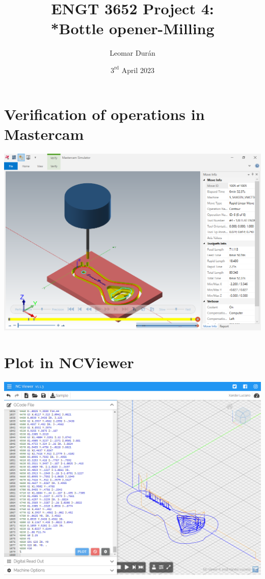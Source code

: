 \documentclass{report}
\title{ENGT 3652 Project 4:\\*Bottle opener-Milling}
\author{Leomar Dur\'an}
\date{$3^{\text{rd}}$ April 2023}
\begin{document}
\maketitle

\chapter{Verification of operations in Mastercam}
\begin{landscape}
\vfill\null
\includegraphics[width=\linewidth]{img/prj04-mastercam_simulator-verification.png}
\vfill\null
\end{landscape}



\chapter{Plot in NCViewer}
\begin{landscape}
\includegraphics[height=\textheight]{img/prj04-ncviewer-plot.png}
\end{landscape}
\end{document}
